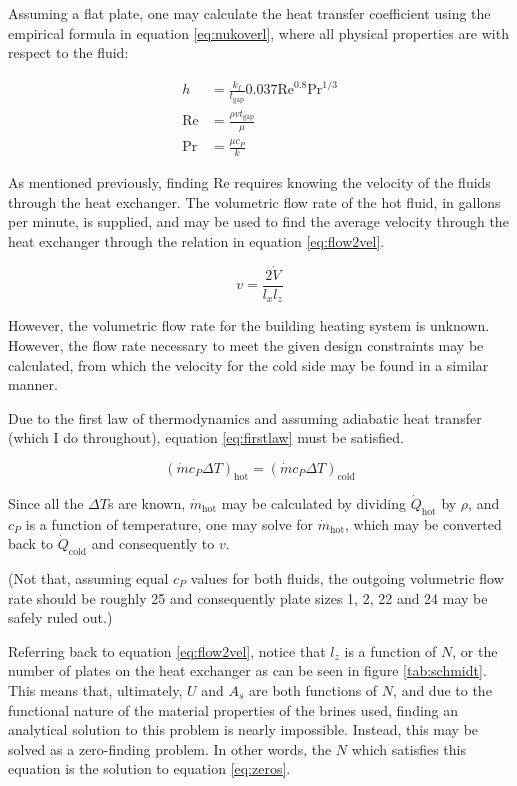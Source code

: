 \documentclass[12pt,letterpaper]{article}
\begin{document}
Assuming a flat plate, one may calculate the heat transfer coefficient using the empirical formula in equation \ref{eq:nukoverl}, where all physical properties are with respect to the fluid:

\begin{align}
\label{eq:nukoverl}
h &=\frac{k_f}{t_{\textrm{gap}}} 0.037\textrm{Re}^{0.8}\textrm{Pr}^{1/3}\\
\label{eq:re}
\textrm{Re}&=\frac{\rho v t_{\textrm{gap}}}{\mu}\\
\label{eq:pr}
\textrm{Pr}&=\frac{\mu c_P}{k}
\end{align}

As mentioned previously, finding Re requires knowing the velocity of the fluids through the heat exchanger.  The volumetric flow rate of the hot fluid, in gallons per minute, is supplied, and may be used to find the average velocity through the heat exchanger through the relation in equation \ref{eq:flow2vel}.

\begin{equation}
\label{eq:flow2vel}
v = \frac{2\dot{V}}{l_x l_z}
\end{equation}

However, the volumetric flow rate for the building heating system is unknown. However, the flow rate necessary to meet the given design constraints may be calculated, from which the velocity for the cold side may be found in a similar manner. 

Due to the first law of thermodynamics and assuming adiabatic heat transfer (which I do throughout), equation \ref{eq:firstlaw} must be satisfied.

\begin{equation}
\label{eq:firstlaw}
\left(\dot{m} c_P \Delta T \right)_{\textrm{hot}} = \left(\dot{m} c_P \Delta T \right)_{\textrm{cold}}
\end{equation}

Since all the \(\Delta T\)s are known, \(\dot{m}_{\textrm{hot}}\) may be calculated by dividing \(\dot{Q}_{\textrm{hot}}\) by \(\rho\), and \(c_P\) is a function of temperature, one may solve for \(\dot{m}_{\textrm{hot}}\), which may be converted back to \(\dot{Q}_{\textrm{cold}}\) and consequently to \(v\).

(Not that, assuming equal \(c_P\) values for both fluids, the outgoing volumetric flow rate should be roughly 25 and consequently plate sizes 1, 2, 22 and 24 may be safely ruled out.)

Referring back to equation \ref{eq:flow2vel}, notice that \(l_z\) is a function of \(N\), or the number of plates on the heat exchanger as can be seen in figure \ref{tab:schmidt}. This means that, ultimately, \(U\) and \(A_s\) are both functions of \(N\), and due to the functional nature of the material properties of the brines used, finding an analytical solution to this problem is nearly impossible.  Instead, this may be solved as a zero-finding problem. In other words, the \(N\) which satisfies this equation is the solution to equation \ref{eq:zeros}.
\end{document}
